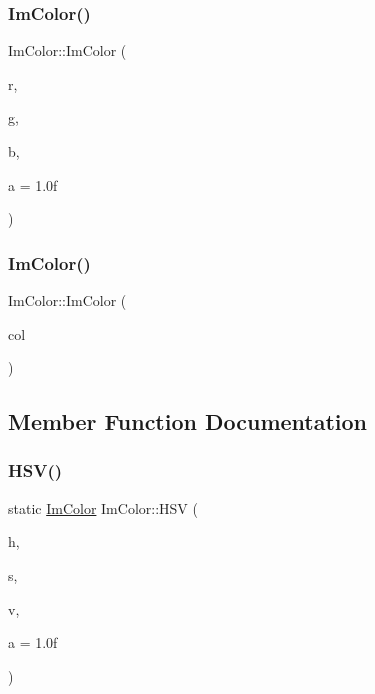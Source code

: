 \hypertarget{struct_im_color_a92b53917ca9d90a7207b18270ff5453d}{}\label{struct_im_color_a92b53917ca9d90a7207b18270ff5453d} 
\subsubsection{\texorpdfstring{Im\+Color()}{ImColor()}\hspace{0.1cm}{\footnotesize\ttfamily [4/5]}}
{\footnotesize\ttfamily Im\+Color\+::\+Im\+Color (\begin{DoxyParamCaption}\item[{float}]{r,  }\item[{float}]{g,  }\item[{float}]{b,  }\item[{float}]{a = {\ttfamily 1.0f} }\end{DoxyParamCaption})}

\hypertarget{struct_im_color_aa5306926b3ef766a8647b26bdfd9f8d2}{}\label{struct_im_color_aa5306926b3ef766a8647b26bdfd9f8d2} 
\subsubsection{\texorpdfstring{Im\+Color()}{ImColor()}\hspace{0.1cm}{\footnotesize\ttfamily [5/5]}}
{\footnotesize\ttfamily Im\+Color\+::\+Im\+Color (\begin{DoxyParamCaption}\item[{const \hyperlink{struct_im_vec4}{Im\+Vec4} \&}]{col }\end{DoxyParamCaption})}



\subsection{Member Function Documentation}
\hypertarget{struct_im_color_ac8cb52119648523038818a613becf010}{}\label{struct_im_color_ac8cb52119648523038818a613becf010} 
\subsubsection{\texorpdfstring{H\+S\+V()}{HSV()}}
{\footnotesize\ttfamily static \hyperlink{struct_im_color}{Im\+Color} Im\+Color\+::\+H\+SV (\begin{DoxyParamCaption}\item[{float}]{h,  }\item[{float}]{s,  }\item[{float}]{v,  }\item[{float}]{a = {\ttfamily 1.0f} }\end{DoxyParamCaption})\hspace{0.3cm}{\ttfamily [static]}}

